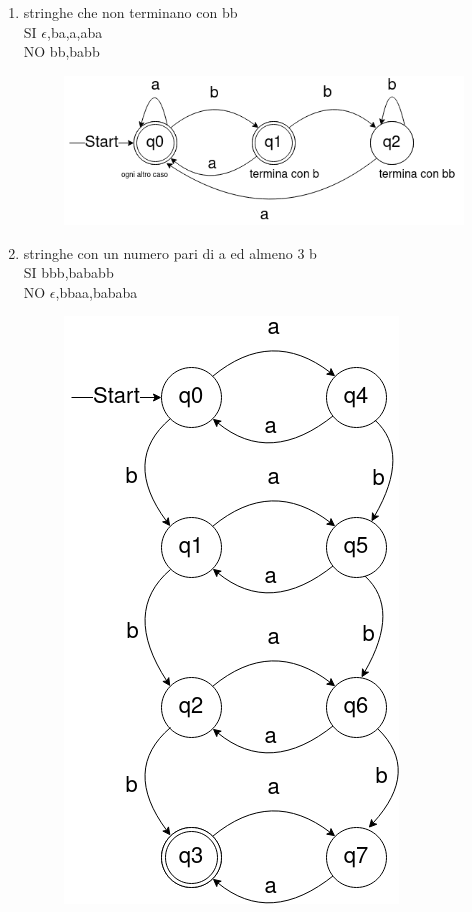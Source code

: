 \documentclass[12pt]{article}
\begin{document}
\begin{enumerate}
\newpage
\item stringhe che non terminano con bb
\\ SI $\epsilon$,ba,a,aba
\\ NO bb,babb

\begin{figure}[h]
  \includegraphics[scale = 0.5]{media/09_21_es3.png}
  \centering
\end{figure}

\newpage
\item stringhe con un numero pari di a ed almeno 3 b
\\ SI bbb,bababb
\\ NO $\epsilon$,bbaa,bababa

\begin{figure}[h]
  \includegraphics[scale = 0.5]{media/09_21_es4.png}
  \centering
\end{figure}


\end{enumerate}
\end{document}
